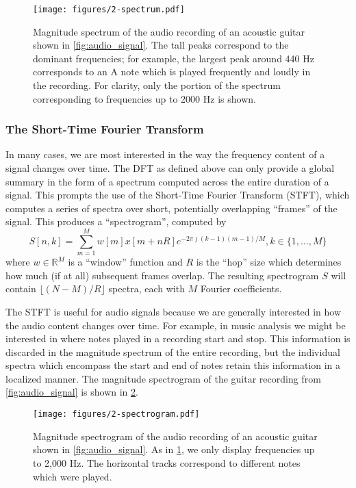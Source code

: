 \begin{figure}
  \centering
  \texttt{[image: figures/2-spectrum.pdf]}
  \caption[Magnitude spectrum of the acoustic guitar recording]{Magnitude spectrum of the audio recording of an acoustic guitar shown in \cref{fig:audio_signal}.
  The tall peaks correspond to the dominant frequencies; for example, the largest peak around 440 Hz corresponds to an A note which is played frequently and loudly in the recording.
  For clarity, only the portion of the spectrum corresponding to frequencies up to 2000 Hz is shown.}
  \label{fig:spectrum}
\end{figure}

\subsubsection{The Short-Time Fourier Transform}

In many cases, we are most interested in the way the frequency content of a signal changes over time.
The DFT as defined above can only provide a global summary in the form of a spectrum computed across the entire duration of a signal.
This prompts the use of the Short-Time Fourier Transform (STFT), which computes a series of spectra over short, potentially overlapping ``frames'' of the signal.
This produces a ``spectrogram'', computed by
\begin{equation}
        S[n, k] = \sum_{m = 1}^M w[m]x[m + nR] e^{-2\pi \jmath (k - 1)(m - 1)/M}, k \in \{1, \ldots, M\}
\end{equation}
where $w \in \mathbb{R}^{M}$ is a ``window'' function and $R$ is the ``hop'' size which determines how much (if at all) subsequent frames overlap.
The resulting spectrogram $S$ will contain $\lfloor (N - M)/R \rfloor$ spectra, each with $M$ Fourier coefficients.

The STFT is useful for audio signals because we are generally interested in how the audio content changes over time.
For example, in music analysis we might be interested in where notes played in a recording start and stop.
This information is discarded in the magnitude spectrum of the entire recording, but the individual spectra which encompass the start and end of notes retain this information in a localized manner.
The magnitude spectrogram of the guitar recording from \cref{fig:audio_signal} is shown in \cref{fig:spectrogram}.

\begin{figure}
  \centering
  \texttt{[image: figures/2-spectrogram.pdf]}
  \caption[Magnitude spectrogram of the acoustic guitar recording]{Magnitude spectrogram of the audio recording of an acoustic guitar shown in \cref{fig:audio_signal}.
  As in \cref{fig:spectrum}, we only display frequencies up to 2,000 Hz.
  The horizontal tracks correspond to different notes which were played.}
  \label{fig:spectrogram}
\end{figure}

